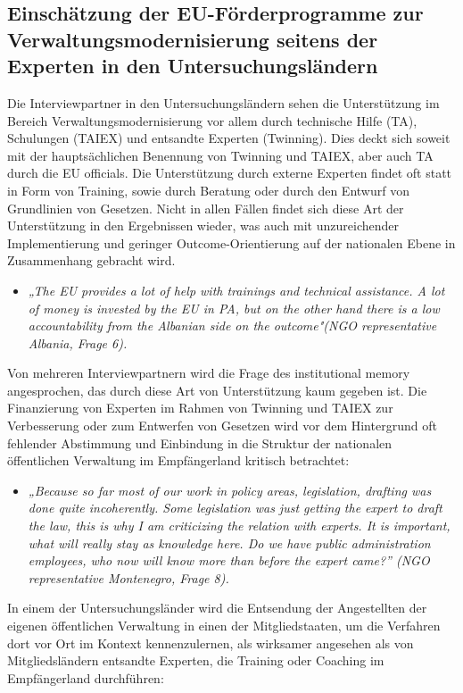 \subsection{Einschätzung der EU-Förderprogramme zur Verwaltungsmodernisierung seitens der Experten in den Untersuchungsländern }
Die Interviewpartner in den Untersuchungsländern sehen die Unterstützung im Bereich Verwaltungsmodernisierung vor allem durch technische Hilfe (TA), Schulungen (TAIEX) und entsandte Experten (Twinning). Dies deckt sich soweit mit der hauptsächlichen Benennung von Twinning und TAIEX, aber auch TA durch die EU officials. Die Unterstützung durch externe Experten findet oft statt in Form von Training, sowie durch Beratung oder durch den Entwurf von Grundlinien von Gesetzen. Nicht in allen Fällen findet sich diese Art der Unterstützung in den Ergebnissen wieder, was auch mit unzureichender Implementierung und geringer Outcome-Orientierung auf der nationalen Ebene in Zusammenhang gebracht wird.
\begin{itemize}[label={}]
\item \textit{„The EU provides a lot of help with trainings and technical assistance. A lot of money is invested by the EU in PA, but on the other hand there is a low accountability from the Albanian side on the outcome"(NGO representative Albania, Frage 6).}
\end{itemize}
Von mehreren Interviewpartnern wird die Frage des institutional memory angesprochen, das durch diese Art von Unterstützung kaum gegeben ist. Die Finanzierung von Experten im Rahmen von Twinning und TAIEX zur Verbesserung oder zum Entwerfen von Gesetzen wird vor dem Hintergrund oft fehlender Abstimmung und Einbindung in die Struktur der nationalen öffentlichen Verwaltung im Empfängerland kritisch betrachtet:
\begin{itemize}[label={}]
\item \textit{„Because so far most of our work in policy areas, legislation, drafting was done quite incoherently. Some legislation was just getting the expert to draft the law, this is why I am criticizing the relation with experts. It is important, what will really stay as knowledge here. Do we have public administration employees, who now will know more than before the expert came?” (NGO representative Montenegro, Frage 8). }
\end{itemize}
In einem der Untersuchungsländer wird die Entsendung der Angestellten der eigenen öffentlichen Verwaltung in einen der Mitgliedstaaten, um die Verfahren dort vor Ort im Kontext kennenzulernen, als wirksamer angesehen als von Mitgliedsländern entsandte Experten, die Training oder Coaching im Empfängerland durchführen:
